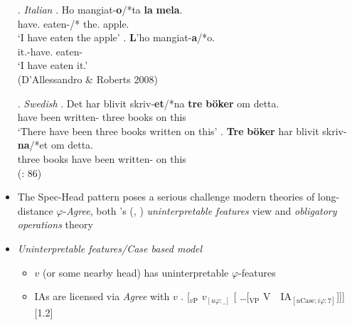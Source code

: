 \documentclass[letterpaper,10pt]{handout_nick}
\begin{document}
\begin{itemize}
\ex.\label{itppa} \emph{Italian}
\ag. Ho mangiat-{\bf o}/*ta {\bf la} {\bf mela}.\\
have. eaten-/* the. apple.\\
`I have eaten the apple'
\bg. {\bf L}'ho mangiat-{\bf a}/*o.\\
it.-have. eaten-\\
`I have eaten it.'\\(D'Allessandro \& Roberts 2008)

\ex. \label{swed1} \emph{Swedish} 
\ag. Det har blivit skriv-{\bf et}/*na {\bf tre} {\bf b\"oker} om detta.\\
 have been written- three books on this\\
`There have been three books written on this'
\bg. {\bf Tre} {\bf b\"oker} har blivit skriv-{\bf na}/*et om detta.\\
three books have been written- on this\\
(\citealt{holmberg01}: 86)

\item The Spec-Head pattern poses a serious challenge modern theories of long-distance $\varphi$-\emph{Agree}, both \citeauthor{chomsky00}'s (\citeyear{chomsky00}, \citeyear{chomsky01}) \emph{uninterpretable features} view and  \emph{obligatory operations} theory
\item \emph{Uninterpretable features/Case based model}
\begin{itemize}
\item $v$ (or some nearby head) has uninterpretable $\varphi$-features
\item IAs are licensed via \emph{Agree} with $v$
\ex. [$_\text{$v$P}$ \hspace*{-.2cm}$v_{[u\varphi:\_]}$ [ \ldots [$_\text{VP}$ V\ \ \hspace*{-.3cm}IA$_{[u\text{Case};i\varphi:7]}$]]]
[1.2]\\


\end{itemize}
\end{itemize}
\end{document}

